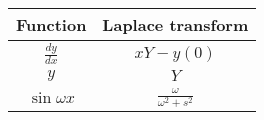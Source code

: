     \begin{tabular}{|c|c|} 
      \hline
\textbf{Function} & \textbf{Laplace transform}\\\hline
         $\frac{dy}{dx}$& $xY-y(0)$ \\\hline
          $y$&$Y$\\\hline
          $\sin{\omega x}$& $\frac{\omega}{\omega^2+s^2}$  \\ \hline
    \end{tabular}
